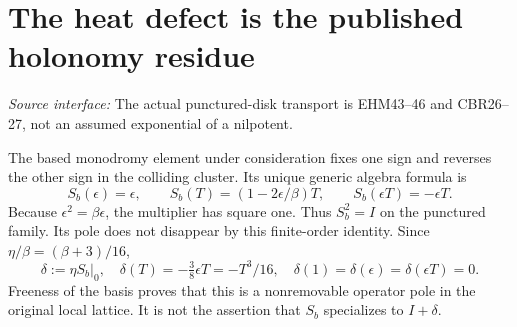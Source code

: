 \documentclass[11pt,a4paper]{article}
\theoremstyle{definition}\newtheorem{definition}[theorem]{Definition}\newtheorem{remark}[theorem]{Remark}
\newcommand{\src}[1]{\textit{Source interface:} #1}
\begin{document}
\section{The heat defect is the published holonomy residue}\label{sec:holonomy}
\src{The actual punctured-disk transport is EHM43--46 and CBR26--27, not an assumed exponential of a nilpotent.}

The based monodromy element under consideration fixes one sign and reverses the other sign in the colliding cluster. Its unique generic algebra formula is
\begin{equation}
 S_b(\epsilon)=\epsilon,\qquad
 S_b(T)=(1-2\epsilon/\beta)T,\qquad
 S_b(\epsilon T)=-\epsilon T.                            \label{eq:sb}
\end{equation}
Because $\epsilon^2=\beta\epsilon$, the multiplier has square one. Thus $S_b^2=I$ on the punctured family. Its pole does not disappear by this finite-order identity. Since $\eta/\beta=(\beta+3)/16$,
\begin{equation}
 \delta:=\left.\eta S_b\right|_0,
 \quad \delta(T)=-\tfrac38\epsilon T=-T^3/16,
 \quad\delta(1)=\delta(\epsilon)=\delta(\epsilon T)=0.
                                                        \label{eq:resdelta}
\end{equation}
Freeness of the basis proves that this is a nonremovable operator pole in the original local lattice. It is not the assertion that $S_b$ specializes to $I+\delta$.
\end{document}
